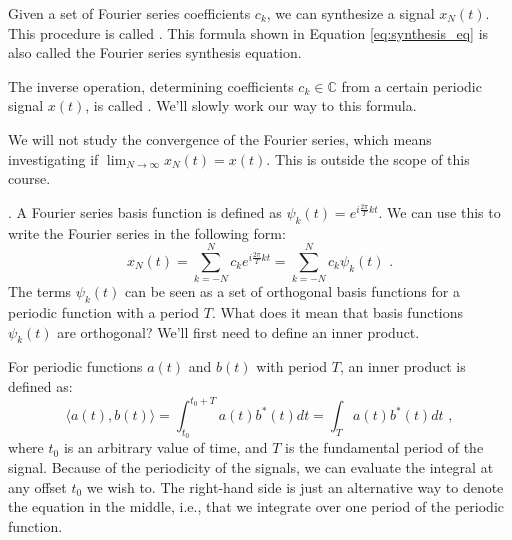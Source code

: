 Given a set of Fourier series coefficients $c_k$, we can synthesize a
signal $x_N(t)$.  This procedure is
called \emph{}.  This formula shown in
Equation \ref{eq:synthesis_eq} is also called the Fourier series
synthesis equation.

The inverse operation, determining coefficients $c_k \in \mathbb{C}$ from a certain
periodic signal $x(t)$, is called \emph{}.
We'll slowly work our way to this formula.

We will not study the convergence of the Fourier series, which means investigating
if $\lim_{N\rightarrow \infty} x_N(t) = x(t)$. This is outside the scope of this course.

. A Fourier series basis function is defined
as $\psi_k(t)=e^{i\frac{2\pi}{T} k t}$.
We can use this to write the Fourier series in the following form:
\begin{equation}
  x_N(t) = \sum_{k=-N}^{N} c_k e^{i \frac{2\pi}{T} k t} = \sum_{k=-N}^{N} c_k \psi_k(t) \,\,.
\end{equation}
The terms $\psi_k(t)$ can be seen as a set of orthogonal basis
functions for a periodic function with a period $T$. What does it mean
that basis functions $\psi_k(t)$ are orthogonal?  We'll first need to
define an inner product.





For periodic functions $a(t)$ and $b(t)$ with period $T$, an inner product is defined as:
\begin{equation}
  \langle a(t), b(t) \rangle = \int_{t_0}^{t_0+T} a(t) b^*(t) dt = \int_T a(t) b^*(t) dt \,\,,
  \label{eq:inner_product_def}
\end{equation}
where $t_0$ is an arbitrary value of time, and $T$ is the fundamental period of the signal.
Because of the periodicity of the signals, we can evaluate the integral at any offset $t_0$ we wish to.
The right-hand side is just an alternative way to denote the equation in the middle, i.e.,
that we integrate over one period of the periodic function.

